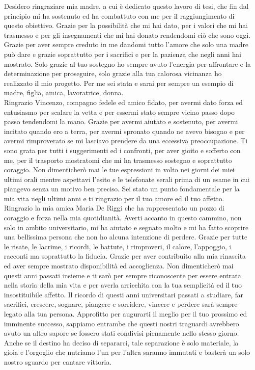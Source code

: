 \documentclass[12pt,a4paper,oneside]{book}
\begin{document}
Desidero ringraziare mia madre, a cui è dedicato questo lavoro di tesi, che fin dal principio mi ha sostenuto ed ha combattuto con me per il raggiungimento di questo obiettivo. Grazie per la possibilità che mi hai dato, per i valori che mi hai trasmesso e per gli insegnamenti che mi hai donato rendendomi ciò che sono oggi. Grazie per aver sempre creduto in me dandomi tutto l'amore che solo una madre può dare e grazie soprattutto per i sacrifici e per la pazienza che negli anni hai mostrato. Solo grazie al tuo sostegno ho sempre avuto l'energia per affrontare e la determinazione per proseguire, solo grazie alla tua calorosa vicinanza ho realizzato il mio progetto. Per me sei stata e sarai per sempre un esempio di madre, figlia, amica, lavoratrice, donna.\\
Ringrazio Vincenzo, compagno fedele ed amico fidato, per avermi dato forza ed entusiasmo per scalare la vetta e per essermi stato sempre vicino passo dopo passo tendendomi la mano. Grazie per avermi aiutato e sostenuto, per avermi incitato quando ero a terra, per avermi spronato quando ne avevo bisogno e per avermi rimproverato se mi lasciavo prendere da una eccessiva preoccupazione. Ti sono grata per tutti i suggerimenti ed i confronti, per aver gioito e sofferto con me, per il trasporto mostratomi che mi ha trasmesso sostegno e soprattutto coraggio. Non dimenticherò mai le tue espressioni in volto nei giorni dei miei ultimi orali mentre aspettavi l'esito e le telefonate serali prima di un esame in cui piangevo senza un motivo ben preciso. Sei stato un punto fondamentale per la mia vita negli ultimi anni e ti ringrazio per il tuo amore ed il tuo affetto.\\
Ringrazio la mia amica Maria De Riggi che ha rappresentato un pozzo di coraggio e forza nella mia quotidianità. Averti accanto in questo cammino, non solo in ambito universitario, mi ha aiutato e segnato molto e mi ha fatto scoprire una bellissima persona che non ho alcuna intenzione di perdere. Grazie per tutte le risate, le lacrime, i ricordi, le battute, i rimproveri, il calore, l'appoggio, i racconti ma soprattutto la fiducia. Grazie per aver contribuito alla mia rinascita ed aver sempre mostrato disponibilità ed accoglienza. Non dimenticherò mai questi anni passati insieme e ti sarò per sempre riconoscente per essere entrata nella storia della mia vita e per averla arricchita con la tua semplicità ed il tuo insostituibile affetto. Il ricordo di questi anni universitari passati a studiare, far sacrifici, crescere, sognare, piangere e sorridere, vincere e perdere sarà sempre legato alla tua persona. Approfitto per augurarti il meglio per il tuo prossimo ed imminente successo, sappiamo entrambe che questi nostri traguardi avrebbero avuto un altro sapore se fossero stati condivisi pienamente nello stesso giorno. Anche se il destino ha deciso di separarci, tale separazione è solo materiale, la gioia e l'orgoglio che nutriamo l'un per l'altra saranno immutati e basterà un solo nostro sguardo per cantare vittoria.\\
\end{document}
